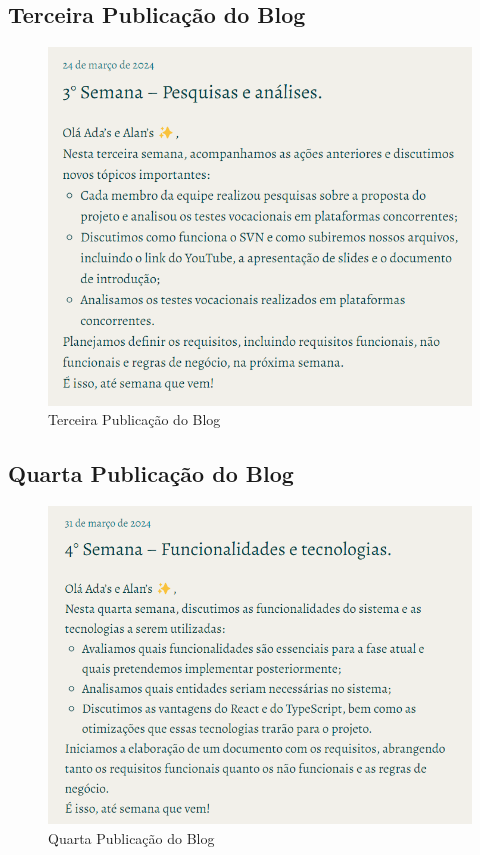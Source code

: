 \begin{apendicesenv}
\subsection*{Terceira Publicação do Blog}
\begin{figure}[H]
    \centering
    \includegraphics[width=1.0\linewidth]{images/Post3.png}
    \caption{Terceira Publicação do Blog}
    \label{fig:terceira}
\end{figure}

\subsection*{Quarta Publicação do Blog}
\begin{figure}[H]
    \centering
    \includegraphics[width=1.0\linewidth]{images/Post4.png}
    \caption{Quarta Publicação do Blog}
    \label{fig:quarta}
\end{figure}


\end{apendicesenv}
